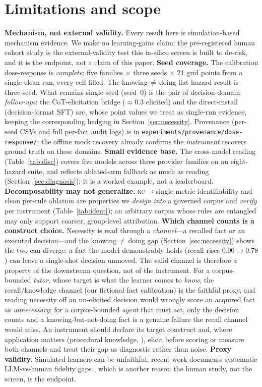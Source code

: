 \documentclass{article}
\newcommand{\kc}{\textsc{kc}}
\begin{document}
\section{Limitations and scope}
\label{sec:limits}
\textbf{Mechanism, not external validity.} Every result here is simulation-based mechanism evidence. We
make no learning-gains claim; the pre-registered human cohort study is the external-validity test this
in-silico screen is built to de-risk, and it is the endpoint, not a claim of this paper.
\textbf{Seed coverage.} The calibration dose-response is \emph{complete}: five families $\times$
three seeds $\times$ 21 grid points from a single clean run, every cell filled. The knowing\,$\neq$\,doing flat-hazard result is three-seed. What remains
single-seed (seed~$0$) is the pair of decision-domain \emph{follow-ups}: the CoT-elicitation bridge
($\approx\!0.3$ elicited) and the direct-install (decision-format SFT) arc, whose point values we treat
as single-run evidence, keeping the corresponding hedging in Section~\ref{sec:necessity}. Provenance
(per-seed CSVs and full per-fact audit logs) is in \texttt{experiments/provenance/dose-response/};
the offline mock recovery already confirms the \emph{instrument} recovers ground truth on these domains.
\textbf{Small evidence base.} The cross-model
reading (Table~\ref{tab:disc}) covers five models across three provider families on an eight-hazard
suite, and reflects ablated-arm fallback as much as reading (Section~\ref{sec:diagnosis}); it is a
worked example, not a leaderboard. \textbf{Decomposability may not generalize.}
\kc$\to$single-metric identifiability and clean per-rule ablation are properties we \emph{design into} a
governed corpus and \emph{verify} per instrument (Table~\ref{tab:ident}); an arbitrary corpus whose
rules are entangled may only support coarser, group-level attribution. \textbf{Which channel counts is a construct choice.} Necessity is read through a \emph{channel}---a
recalled fact or an executed decision---and the knowing\,$\neq$\,doing gap (Section~\ref{sec:necessity})
shows the two can diverge: a fact the model demonstrably holds (recall rises $0.00\!\to\!0.78$) can
leave a single-shot decision unmoved. The valid channel is therefore a property of the downstream
question, not of the instrument. For a corpus-bounded \emph{tutor}, whose target is what the learner
comes to \emph{know}, the recall/knowledge channel (our fictional-fact calibration) is the faithful
proxy, and reading necessity off an un-elicited decision would wrongly score an acquired fact as
\emph{unnecessary}; for a corpus-bounded \emph{agent} that must act, only the decision counts and a
knowing-but-not-doing fact is a genuine failure the recall channel would miss. An instrument should
declare its target construct and, where application matters (procedural knowledge, \citealp{koedinger2012kli}),
elicit before scoring or measure both channels and treat their gap as diagnostic rather than noise.
\textbf{Proxy validity.}
Simulated learners can be unfaithful; recent work documents systematic LLM-vs-human fidelity gaps
\citep{validsim2026,studentfidelity2025,studentabilities2025}, which is another reason the human study,
not the screen, is the endpoint.
\end{document}

